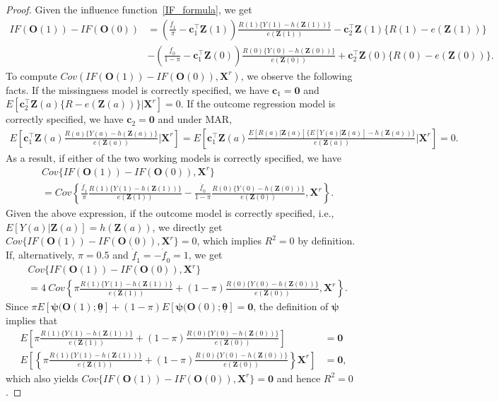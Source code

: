 \documentclass[12pt]{article}
\newcommand{\bX}{\boldsymbol{X}}
\newcommand{\bO}{\boldsymbol{O}}
\newcommand{\bZ}{\boldsymbol{Z}}
\newcommand{\bzero}{\boldsymbol{0}}
\newcommand{\btheta}{\boldsymbol{\theta}}
\newcommand{\bpsi}{\boldsymbol{\psi}}
\begin{document}
\begin{proof}
Given the influence function~\eqref{IF_formula}, we get
\begin{align*}
    IF(\bO(1)) - IF(\bO(0)) &= \left(\frac{\dot{\underline{f}}_1}{\pi} - \boldsymbol{c}_1^\top \bZ(1) \right)\frac{R(1)\{Y(1)-h(\bZ(1))\}}{ e(\bZ(1))} - \boldsymbol{c}_2^\top \bZ(1)\{R(1)- e(\bZ(1))\} \\
    & -  \left(\frac{\dot{\underline{f}}_0}{1-\pi} - \boldsymbol{c}_1^\top \bZ(0) \right)\frac{R(0)\{Y(0)-h(\bZ(0))\}}{ e(\bZ(0))} + \boldsymbol{c}_2^\top \bZ(0)\{R(0)- e(\bZ(0))\}.
\end{align*}
To compute $Cov(IF(\bO(1)) - IF(\bO(0)), \bX^r)$, we observe the following facts. If the missingness model is correctly specified, we have $\boldsymbol{c}_1 = \bzero$ and $E[\boldsymbol{c}_2^\top \bZ(a)\{R- e(\bZ(a))\}|\bX^r] = 0$. If the outcome regression model is correctly specified, we have $\boldsymbol{c}_2 = \bzero$ and under MAR,
\begin{align*}
    E\left[\boldsymbol{c}_1^\top \bZ(a)\frac{R(a)\{Y(a)-h(\bZ(a))\}}{ e(\bZ(a))}\bigg| \bX^r\right] = E\left[\boldsymbol{c}_1^\top \bZ(a)\frac{E[R(a)|\bZ(a)]\{E[Y(a)|\bZ(a)]-h(\bZ(a))\}}{ e(\bZ(a))}\bigg| \bX^r\right] = 0.
\end{align*}
As a result, if either of the two working models is correctly specified, we have
\begin{align}
    & Cov\{IF(\bO(1)) - IF(\bO(0)), \bX^r\}\nonumber\\
    &= Cov\left\{\frac{\dot{\underline{f}}_1}{\pi} \frac{R(1)\{Y(1)-h(\bZ(1))\}}{ e(\bZ(1))} -  \frac{\dot{\underline{f}}_0}{1-\pi} \frac{R(0)\{Y(0)-h(\bZ(0))\}}{ e(\bZ(0))}, \bX^r\right\}.\label{proof1-cov}
\end{align}
Given the above expression, if the outcome model is correctly specified, i.e., $E[Y(a)|\bZ(a)] = h(\bZ(a))$, we directly get $Cov\{IF(\bO(1)) - IF(\bO(0)), \bX^r\} = 0$, which implies $R^2=0$ by definition. If, alternatively, $\pi = 0.5$ and $\dot{\underline{f}}_1 = - \dot{\underline{f}}_0 = 1$, we get
\begin{align*}
    & Cov\{IF(\bO(1)) - IF(\bO(0)), \bX^r\}\\
    &= 4\ Cov\left\{\pi \frac{R(1)\{Y(1)-h(\bZ(1))\}}{ e(\bZ(1))} + (1-\pi) \frac{R(0)\{Y(0)-h(\bZ(0))\}}{ e(\bZ(0))}, \bX^r\right\}.
\end{align*}
Since $\pi E[\bpsi(\bO(1);\underline{\btheta}] + (1-\pi) E[\bpsi(\bO(0);\underline{\btheta}] =\bzero$, the definition of $\bpsi$ implies that
\begin{align*}
    E\left[\pi \frac{R(1)\{Y(1)-h(\bZ(1))\}}{ e(\bZ(1))} + (1-\pi) \frac{R(0)\{Y(0)-h(\bZ(0))\}}{ e(\bZ(0))}\right] &= \bzero \\
    E\left[\left\{\pi \frac{R(1)\{Y(1)-h(\bZ(1))\}}{ e(\bZ(1))} + (1-\pi) \frac{R(0)\{Y(0)-h(\bZ(0))\}}{ e(\bZ(0))}\right\}\bX^r\right] &= \bzero,
\end{align*}
which also yields $Cov\{IF(\bO(1)) - IF(\bO(0)), \bX^r\} = \bzero$ and hence $R^2=0$.


\end{proof}
\end{document}
